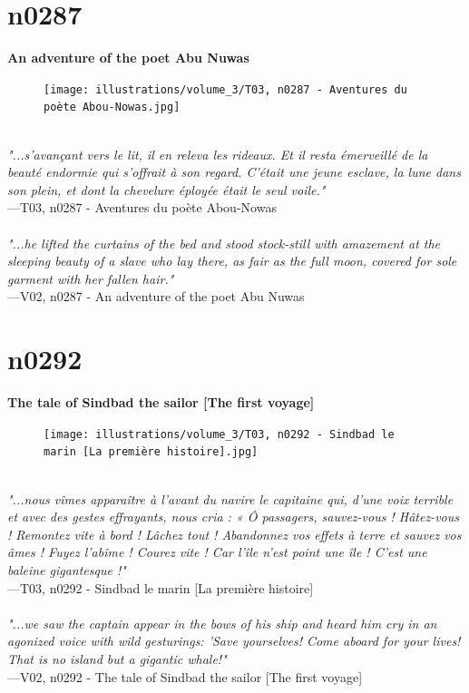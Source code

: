\documentclass[../Carre_nights.tex]{subfiles}
\begin{document}
\newpage

\section{n0287}
\textbf{\Large{An adventure of the poet Abu Nuwas}} \\

\begin{figure}[ht]
\centering
\texttt{[image: illustrations/volume\_3/T03, n0287 - Aventures du poète Abou-Nowas.jpg]}
\end{figure}

\textit{\\
"...s’avançant vers le lit, il en releva les rideaux. Et il resta émerveillé de la beauté endormie qui s’offrait à son regard. C’était une jeune esclave, la lune dans son plein, et dont la chevelure éployée était le seul voile."} \\
—T03, n0287 - Aventures du poète Abou-Nowas \\~\\
\textit{"...he lifted the curtains of the bed and stood stock-still with amazement at the sleeping beauty of a slave who lay there, as fair as the full moon, covered for sole garment with her fallen hair."} \\
—V02, n0287 - An adventure of the poet Abu Nuwas

\newpage

\section{n0292}
\textbf{\Large{The tale of Sindbad the sailor [The first voyage]}} \\

\begin{figure}[ht]
\centering
\texttt{[image: illustrations/volume\_3/T03, n0292 - Sindbad le marin [La première histoire].jpg]}
\end{figure}

\textit{\\
"...nous vîmes apparaître à l’avant du navire le capitaine qui, d’une voix terrible et avec des gestes effrayants, nous cria : « Ô passagers, sauvez-vous ! Hâtez-vous ! Remontez vite à bord ! Lâchez tout ! Abandonnez vos effets à terre et sauvez vos âmes ! Fuyez l’abîme ! Courez vite ! Car l’île n’est point une île ! C’est une baleine gigantesque !"} \\
—T03, n0292 - Sindbad le marin [La première histoire] \\~\\
\textit{"...we saw the captain appear in the bows of his ship and heard him cry in an agonized voice with wild gesturings: 'Save yourselves! Come aboard for your lives! That is no island but a gigantic whale!"} \\
—V02, n0292 - The tale of Sindbad the sailor [The first voyage]
\end{document}
